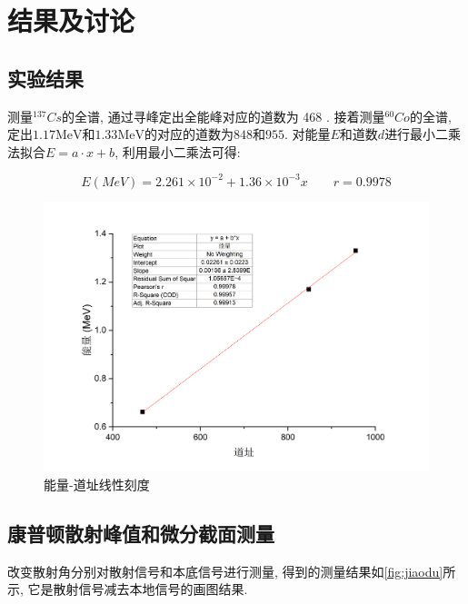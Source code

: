 \documentclass[font=default]{mpltx}
\begin{document}
\section{结果及讨论}

  \subsection{实验结果}

    测量${^{137}Cs}$的全谱, 通过寻峰定出全能峰对应的道数为 468 . 接着测量${^{60}Co}$的全谱, 定出$1.17\text{MeV}$和$1.33\text{MeV}$的对应的道数为$848$和$955$.
    对能量$E$和道数$d$进行最小二乘法拟合$E = a \cdot x + b $, 
    利用最小二乘法可得: 

	  \begin{equation}
		  E(MeV)=2.261 \times 10^{-2}+1.36 \times 10^{-3} x\qquad r=0.9978
	  \end{equation}

    \begin{figure}[htbp]
      \centering
      \includegraphics[width=0.85\linewidth]{fig/nihe.png}
      \caption{能量-道址线性刻度}
      \label{fig:nihe}
    \end{figure}

    \subsection{康普顿散射峰值和微分截面测量}

    改变散射角分别对散射信号和本底信号进行测量,  得到的测量结果如\autoref{fig:jiaodu}所示, 它是散射信号减去本地信号的画图结果. 
    
\end{document}
